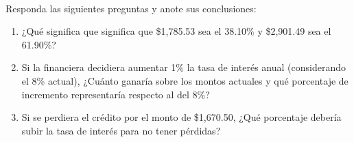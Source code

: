 \documentclass{article}
\begin{document}
\\[12pt]
Responda las siguientes preguntas y anote sus conclusiones:
\begin{enumerate}
    \item ¿Qué significa que significa que \$1,785.53 sea el 38.10\% y \$2,901.49 sea el 61.90\%?
    \item Si la financiera decidiera aumentar 1\% la tasa de interés anual (considerando el 8\% actual), ¿Cuánto ganaría sobre los montos actuales y qué porcentaje de incremento representaría respecto al del 8\%?
    \item Si se perdiera el crédito por el monto de \$1,670.50, ¿Qué porcentaje debería subir la tasa de interés para no tener pérdidas?
\end{enumerate}
\end{document}

